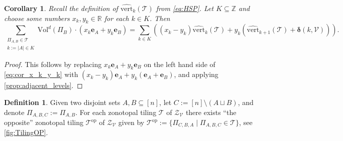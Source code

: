 \documentclass[11pt]{amsart}
\theoremstyle{plain}
\newtheorem{corollary}[theorem]{Corollary}
\theoremstyle{definition}
\newtheorem{definition}[theorem]{Definition}
\def\Z{\mathbb{Z}}
\def\R{\mathbb{R}}
\def\V{\mathcal{V}}
\def\ddelta{\bm{\delta}}
\def\e{{\bm{e}}}
\def\Zon{\mathcal{Z}}
\def\ZV{\Zon_\V}
\def\Vol{\mathrm{Vol}}
\newcommand\wh[1]{\hstretch{2}{\hat{\hstretch{0.5}{#1}}}}
\def\vert{\mathrm{vert}}
\def\vertHSP{\wh\vert}
\def\vertHSP{\widehat{\vert}}
\def\VC{\V}
\def\Tcal{\mathcal{T}}
\def\Tiling{\Tcal}
\def\tile{\Pi}
\newcommand\summa[2]{\sum_{\substack{#1 \\ #2}}}
\def\sumcond#1{\summa{\tile_{A,B}\in\Tiling}{#1}}
\def\VolX(#1){\Vol^d(\tile_{#1})}
\def\VolB{\VolX(B)}
\let\subset\subseteq
\begin{document}
\begin{corollary}\label{cor:x_k_y_k}
Recall the definition of 
$\vertHSP_k(\Tiling)$
	from \eqref{eq:HSP}.
Let $K\subset \Z$ and choose some numbers $x_k,y_k\in \R$ for each $k\in K$. Then 
\begin{equation}\label{eq:cor_x_k_y_k}
\sumcond{k:=|A|\in K} \VolB\cdot (x_k\e_A+y_k\e_B)=  \sum_{k\in K} \left((x_k-y_k)\vertHSP_k(\Tiling) +y_k(\vertHSP_{k+1}(\Tiling)+\ddelta(k,\VC))\right).
\end{equation}
\end{corollary}
\begin{proof}
This follows by replacing $x_k\e_A+y_k\e_B$ on the left hand side of 
	\eqref{eq:cor_x_k_y_k} with $(x_k-y_k)\e_A+y_k(\e_A+\e_B)$, and applying \cref{prop:adjacent_levels}.
\end{proof}



\def\TilingOP{\Tiling^{\operatorname{op}}}
\def\one_#1{\e_{[#1]}}

\begin{definition}\label{def:op}
Given two disjoint sets $A,B\subset[n]$, let $C:=[n]\setminus(A\sqcup B)$, and denote $\tile_{A,B,C}:=\tile_{A,B}$. For each zonotopal tiling $\Tiling$ of $\ZV$ there exists ``the opposite'' zonotopal tiling $\TilingOP$ of $\ZV$ given by $\TilingOP:=\{\tile_{C,B,A}\mid \tile_{A,B,C}\in\Tiling\}$, see \cref{fig:TilingOP}.
\end{definition}
\end{document}
